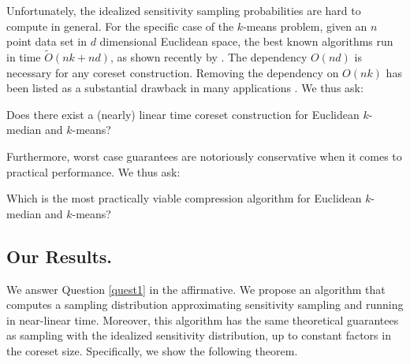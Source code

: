 Unfortunately, the idealized sensitivity sampling probabilities are hard to compute in general. For the specific case of the $k$-means problem, given an $n$ point data set in $d$ dimensional Euclidean space, the best known algorithms run in time $\tilde{O}(nk+nd)$, as shown recently by \cite{DSWY22}. The dependency $O(nd)$ is necessary for any coreset construction. Removing the dependency on $O(nk)$ has been listed as a substantial drawback in many applications \cite{Feldman20}. We thus ask:


\begin{question}
\label{quest1}
Does there exist a (nearly) linear time coreset construction for Euclidean $k$-median and $k$-means?
\end{question}

Furthermore, worst case guarantees are notoriously conservative when it comes to practical performance. We thus ask:
\begin{question}
\label{quest2}
Which is the most practically viable compression algorithm for Euclidean $k$-median and $k$-means?
\end{question}

\subsection{Our Results.}

We answer Question \ref{quest1} in the affirmative. We propose an algorithm that computes a sampling distribution approximating sensitivity sampling and running in near-linear time. Moreover, this algorithm has the same theoretical
guarantees as sampling with the idealized sensitivity distribution, up to constant factors in the coreset size. 
Specifically, we show the following theorem.


